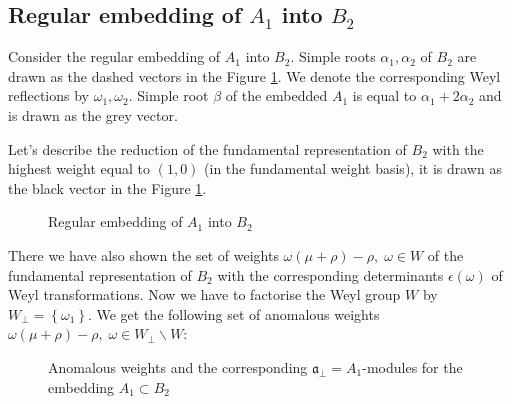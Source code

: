 \documentclass[a4paper,12pt]{article}
\theoremstyle{definition} \newtheorem{Def}{Definition}
\begin{document}
\subsection{Regular embedding of $A_1$ into $B_2$}
\label{sec:regul-embedd-a_1}

Consider the regular embedding of $A_1$ into $B_2$. Simple roots $\alpha_1, \alpha_2$ of $B_2$ are drawn as the dashed vectors in the Figure \ref{fig:B2_A1}. We denote the corresponding Weyl reflections by $\omega_1, \omega_2$. Simple root $\beta$ of the embedded $A_1$ is equal to $\alpha_1+2\alpha_2$ and is drawn as the grey vector.

Let's describe the reduction of the fundamental representation of $B_2$ with the highest weight equal to $(1,0)$ (in the fundamental weight basis), it is drawn as the black vector in the Figure \ref{fig:B2_A1}.
\begin{figure}[th]
  \noindent{}
  \caption{Regular embedding of $A_1$ into $B_2$}
  \label{fig:B2_A1}
\end{figure}
There we have also shown the set of weights $\omega(\mu+\rho)-\rho,\; \omega\in W$ of the fundamental representation of $B_2$ with the corresponding determinants $\epsilon(\omega)$ of Weyl transformations.
Now we have to factorise the Weyl group $W$ by $W_{\bot}=\left\{\omega_1\right\}$. We get the following set of anomalous weights $\omega(\mu+\rho)-\rho,\; \omega\in W_{\bot}\backslash W$:
\begin{figure}[t]
  \noindent{}
  \caption{Anomalous weights and the corresponding $\mathfrak{a}_{\bot}=A_1$-modules for the embedding $A_1\subset B_2$}
  \label{fig:B2_A1_2}
\end{figure}
\end{document}
